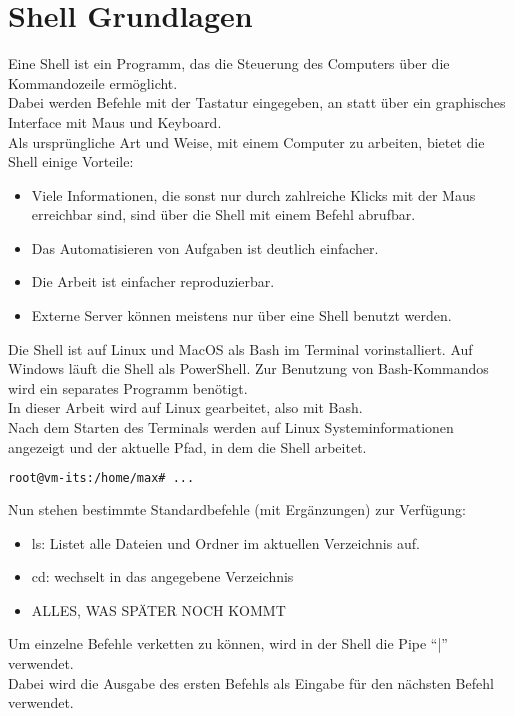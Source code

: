 \section{Shell Grundlagen}\label{sec:shell-grundlagen}

Eine Shell ist ein Programm, das die Steuerung des Computers über die Kommandozeile ermöglicht.\\

Dabei werden Befehle mit der Tastatur eingegeben, an statt über ein graphisches Interface mit Maus und Keyboard.\\

Als ursprüngliche Art und Weise, mit einem Computer zu arbeiten, bietet die Shell einige Vorteile:
\begin{itemize}
    \item Viele Informationen, die sonst nur durch zahlreiche Klicks mit der Maus erreichbar sind, sind über die Shell mit einem Befehl abrufbar.
    \item Das Automatisieren von Aufgaben ist deutlich einfacher.
    \item Die Arbeit ist einfacher reproduzierbar.
    \item Externe Server können meistens nur über eine Shell benutzt werden.
\end{itemize}

Die Shell ist auf Linux und MacOS als Bash im Terminal vorinstalliert.
Auf Windows läuft die Shell als PowerShell. Zur Benutzung von Bash-Kommandos wird ein separates Programm benötigt.\\
In dieser Arbeit wird auf Linux gearbeitet, also mit Bash.\\

Nach dem Starten des Terminals werden auf Linux Systeminformationen angezeigt und der aktuelle Pfad, in dem die Shell arbeitet.\\

\begin{lstlisting}[language=Bash, caption=Beispiel Bash Start,label={lst:lstlisting}]
root@vm-its:/home/max# ...
\end{lstlisting}
\vspace{5mm}

Nun stehen bestimmte Standardbefehle (mit Ergänzungen) zur Verfügung:
\begin{itemize}
    \item ls: Listet alle Dateien und Ordner im aktuellen Verzeichnis auf.
    \item cd: wechselt in das angegebene Verzeichnis
    \item ALLES, WAS SPÄTER NOCH KOMMT
\end{itemize}

Um einzelne Befehle verketten zu können, wird in der Shell die Pipe "`|"' verwendet.\\
Dabei wird die Ausgabe des ersten Befehls als Eingabe für den nächsten Befehl verwendet.
